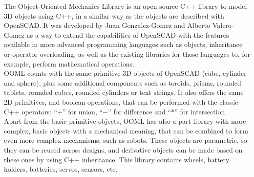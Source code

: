 The Object-Oriented Mechanics Library \cite{ooml:website, Valero-Gomez2012} is an open source C++ library to model 3D objects using C++, in a similar way as the objects are described with OpenSCAD. It was developed by Juan Gonzalez-Gomez and Alberto Valero-Gomez as a way to extend the capabilities of OpenSCAD with the features available in more advanced programming languages such as objects, inheritance or operator overloading, as well as the existing libraries for those languages to, for example, perform mathematical operations.\\

OOML counts with the same primitive 3D objects of OpenSCAD (cube, cylinder and sphere), plus some additional components such as toroids, prisms, rounded tablets, rounded cubes, rounded cylinders or text strings. It also offers the same 2D primitives, and boolean operations, that can be performed with the classic C++ operators: ``$+$'' for union, ``$-$'' for difference and ``$*$'' for intersection.\\

Apart from the basic primitive objects, OOML has also a part library with 
more complex, basic objects with a mechanical meaning, that can be combined to form even more complex mechanisms, such as robots. These objects are parametric, so they can be reused across designs, and derivative objects can be made based on these ones by using C++ inheritance. This library contains wheels, battery holders, batteries, servos, sensors, etc.\\

